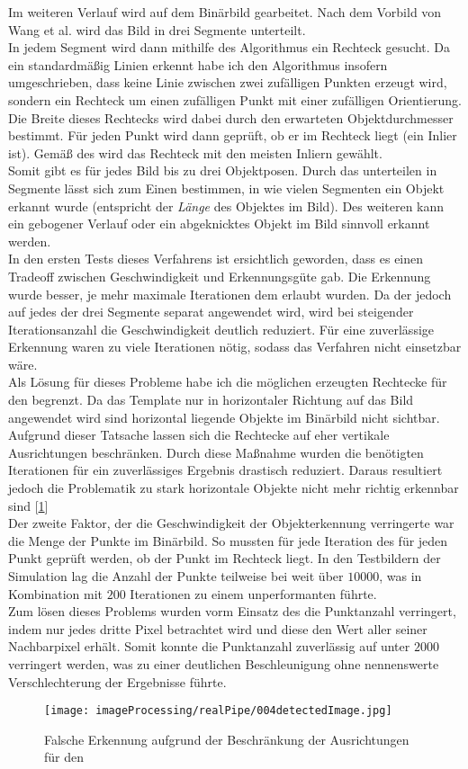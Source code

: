Im weiteren Verlauf wird auf dem Binärbild gearbeitet. Nach dem Vorbild von Wang et al. \cite{wang2004lane} wird das Bild in drei Segmente unterteilt.\\
In jedem Segment wird dann mithilfe des \rans Algorithmus ein Rechteck gesucht. Da ein \rans standardmäßig Linien erkennt habe ich den Algorithmus insofern umgeschrieben, dass keine Linie zwischen zwei zufälligen Punkten erzeugt wird, sondern ein Rechteck um einen zufälligen Punkt mit einer zufälligen Orientierung. Die Breite dieses Rechtecks wird dabei durch den erwarteten Objektdurchmesser bestimmt. Für jeden Punkt wird dann geprüft, ob er im Rechteck liegt (ein Inlier ist). Gemäß des \rans wird das Rechteck mit den meisten Inliern gewählt.\\
Somit gibt es für jedes Bild bis zu drei Objektposen. Durch das unterteilen in Segmente lässt sich zum Einen bestimmen, in wie vielen Segmenten ein Objekt erkannt wurde (entspricht der \textit{Länge} des Objektes im Bild). Des weiteren kann ein gebogener Verlauf oder ein abgeknicktes Objekt im Bild sinnvoll erkannt werden.\\
In den ersten Tests dieses Verfahrens ist ersichtlich geworden, dass es einen Tradeoff  zwischen Geschwindigkeit und Erkennungsgüte gab. Die Erkennung wurde besser, je mehr maximale Iterationen dem \rans erlaubt wurden. Da der \rans jedoch auf jedes der drei Segmente separat angewendet wird, wird bei steigender Iterationsanzahl die Geschwindigkeit deutlich reduziert. Für eine zuverlässige Erkennung waren zu viele Iterationen nötig, sodass das Verfahren nicht einsetzbar wäre.\\
Als Lösung für dieses Probleme habe ich die möglichen erzeugten Rechtecke für den \rans begrenzt. Da das Template nur in horizontaler Richtung auf das Bild angewendet wird sind horizontal liegende Objekte im Binärbild nicht sichtbar. Aufgrund dieser Tatsache lassen sich die Rechtecke auf eher vertikale Ausrichtungen beschränken. Durch diese Maßnahme wurden die benötigten Iterationen für ein zuverlässiges Ergebnis drastisch reduziert. Daraus resultiert jedoch die Problematik zu stark horizontale Objekte nicht mehr richtig erkennbar sind [\ref{detecFail}]\\
Der zweite Faktor, der die Geschwindigkeit der Objekterkennung verringerte war die Menge der Punkte im Binärbild. So mussten für jede Iteration des \rans für jeden Punkt geprüft werden, ob der Punkt im Rechteck liegt. In den Testbildern der Simulation lag die Anzahl der Punkte teilweise bei weit über $10000$, was in Kombination mit $200$ Iterationen zu einem unperformanten führte.\\ Zum lösen dieses Problems wurden vorm Einsatz des \rans die Punktanzahl verringert, indem nur jedes dritte Pixel betrachtet wird und diese den Wert aller seiner Nachbarpixel erhält.  Somit konnte die Punktanzahl zuverlässig auf unter $2000$ verringert werden, was zu einer deutlichen Beschleunigung ohne nennenswerte Verschlechterung der Ergebnisse führte.
\begin{figure}[H]
\centering
\texttt{[image: imageProcessing/realPipe/004detectedImage.jpg]}
\caption{Falsche Erkennung aufgrund der Beschränkung der Ausrichtungen für den \rans}
\label{detecFail}
\end{figure}

